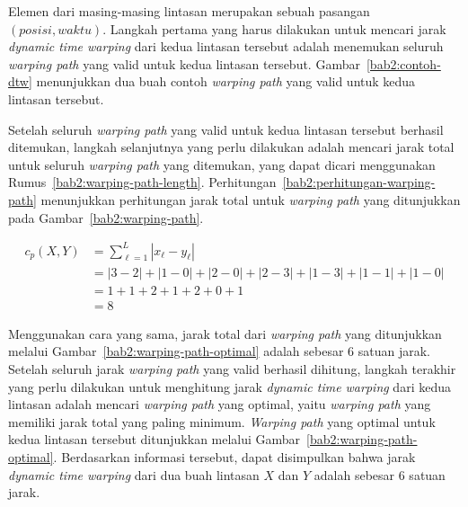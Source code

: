 Elemen dari masing-masing lintasan merupakan sebuah pasangan $(posisi, waktu)$. Langkah pertama yang harus dilakukan untuk mencari jarak \textit{dynamic time warping} dari kedua lintasan tersebut adalah menemukan seluruh \textit{warping path} yang valid untuk kedua lintasan tersebut. Gambar~\ref{bab2:contoh-dtw} menunjukkan dua buah contoh \textit{warping path} yang valid untuk kedua lintasan tersebut.

Setelah seluruh \textit{warping path} yang valid untuk kedua lintasan tersebut berhasil ditemukan, langkah selanjutnya yang perlu dilakukan adalah mencari jarak total untuk seluruh \textit{warping path} yang ditemukan, yang dapat dicari menggunakan Rumus~\ref{bab2:warping-path-length}. Perhitungan~\ref{bab2:perhitungan-warping-path} menunjukkan perhitungan jarak total untuk \textit{warping path} yang ditunjukkan pada Gambar~\ref{bab2:warping-path}.

\begin{equation}
    \begin{aligned}
        c_p(X, Y) & = \sum_{\ell = 1}^{L} |x_\ell - y_\ell| \\
        & = |3 - 2| + |1 - 0| + |2 - 0| + |2 - 3| + |1 - 3| + |1 - 1| + |1 - 0| \\
        & = 1 + 1 + 2 + 1 + 2 + 0 + 1 \\
        & = 8
    \end{aligned}
    \label{bab2:perhitungan-warping-path}
\end{equation}

Menggunakan cara yang sama, jarak total dari \textit{warping path} yang ditunjukkan melalui Gambar~\ref{bab2:warping-path-optimal} adalah sebesar $6$ satuan jarak. Setelah seluruh jarak \textit{warping path} yang valid berhasil dihitung, langkah terakhir yang perlu dilakukan untuk menghitung jarak \textit{dynamic time warping} dari kedua lintasan adalah mencari \textit{warping path} yang optimal, yaitu \textit{warping path} yang memiliki jarak total yang paling minimum. \textit{Warping path} yang optimal untuk kedua lintasan tersebut ditunjukkan melalui Gambar~\ref{bab2:warping-path-optimal}. Berdasarkan informasi tersebut, dapat disimpulkan bahwa jarak \textit{dynamic time warping} dari dua buah lintasan $X$ dan $Y$ adalah sebesar $6$ satuan jarak.

